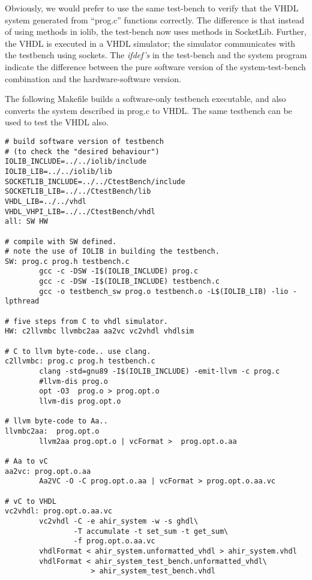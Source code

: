 \documentclass{article}
\begin{document}
Obviously, we would prefer to use the same test-bench
to verify that the VHDL system generated from ``prog.c'' 
functions correctly.  
The difference is that instead of using methods in iolib,
the test-bench now uses methods in SocketLib.  Further, the
VHDL is executed in a VHDL simulator; the simulator communicates
with the testbench using sockets.
The {\em ifdef's} in the test-bench and the system program
indicate the difference between the pure software version
of the system-test-bench combination and the hardware-software
version.  

The following Makefile builds a software-only testbench
executable, and also converts the system described in prog.c
to VHDL.  The same testbench can be used to test the VHDL
also.
\begin{verbatim}
# build software version of testbench 
# (to check the "desired behaviour")
IOLIB_INCLUDE=../../iolib/include
IOLIB_LIB=../../iolib/lib
SOCKETLIB_INCLUDE=../../CtestBench/include
SOCKETLIB_LIB=../../CtestBench/lib
VHDL_LIB=../../vhdl
VHDL_VHPI_LIB=../../CtestBench/vhdl
all: SW HW 

# compile with SW defined.
# note the use of IOLIB in building the testbench.
SW: prog.c prog.h testbench.c 
        gcc -c -DSW -I$(IOLIB_INCLUDE) prog.c
        gcc -c -DSW -I$(IOLIB_INCLUDE) testbench.c
        gcc -o testbench_sw prog.o testbench.o -L$(IOLIB_LIB) -lio -lpthread

# five steps from C to vhdl simulator.
HW: c2llvmbc llvmbc2aa aa2vc vc2vhdl vhdlsim

# C to llvm byte-code.. use clang.
c2llvmbc: prog.c prog.h testbench.c
        clang -std=gnu89 -I$(IOLIB_INCLUDE) -emit-llvm -c prog.c
        #llvm-dis prog.o
        opt -O3	 prog.o > prog.opt.o
        llvm-dis prog.opt.o

# llvm byte-code to Aa..
llvmbc2aa:  prog.opt.o
        llvm2aa prog.opt.o | vcFormat >  prog.opt.o.aa

# Aa to vC
aa2vc: prog.opt.o.aa
        Aa2VC -O -C prog.opt.o.aa | vcFormat > prog.opt.o.aa.vc

# vC to VHDL
vc2vhdl: prog.opt.o.aa.vc
        vc2vhdl -C -e ahir_system -w -s ghdl\
                -T accumulate -t set_sum -t get_sum\
                -f prog.opt.o.aa.vc 
        vhdlFormat < ahir_system.unformatted_vhdl > ahir_system.vhdl
        vhdlFormat < ahir_system_test_bench.unformatted_vhdl\
                    > ahir_system_test_bench.vhdl
        

\end{verbatim}
\end{document}
